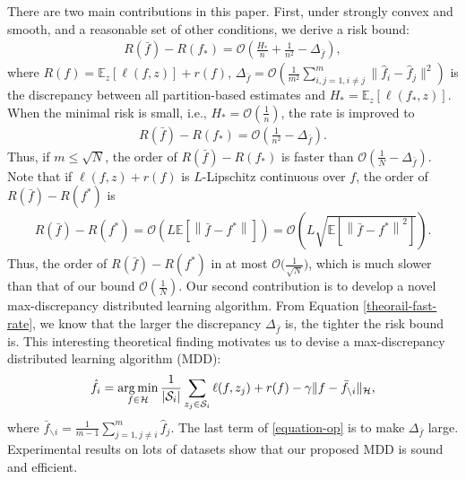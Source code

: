 \documentclass{article}
\newcommand{\argmin}{\operatornamewithlimits{arg\,min}}
\begin{document}
There are two main contributions in this paper.
First, under strongly convex and smooth, and a reasonable set of other conditions,
we derive a risk bound:
\begin{align}
\label{theorail-fast-rate}
    R(\bar{f})-R(f_\ast)=\mathcal{O}\left(\frac{H_\ast}{n}
    +\frac{1}{n^2}
    -\Delta_{\bar{f}}\right),
  \end{align}
  where $R(f)=\mathbb{E}_{z}[\ell(f,z)]+r(f)$,
  $\Delta_{\bar{f}}=\mathcal{O}\left(\frac{1}{m^2}\sum_{i,j=1,i\not=j}^m\|\hat{f}_i-\hat{f}_j\|^2\right)$ is the discrepancy between all partition-based estimates and
  $H_\ast=\mathbb{E}_{z}\left[\ell(f_\ast,z)\right]$.
When the minimal risk is small, i.e., $H_\ast=\mathcal{O}\left(\frac{1}{n}\right)$,
the rate is improved to
\begin{align*}
    R(\bar{f})-R(f_\ast)=\mathcal{O}\left(\frac{1}{n^2}-\Delta_{\bar{f}}\right).
\end{align*}
Thus, if $m\leq \sqrt{N}$, the order of $R(\bar{f})-R(f_\ast)$ is faster than
$\mathcal{O}\left(\frac{1}{N}-\Delta_{\bar{f}}\right).$
Note that if $\ell(f,z)+r(f)$ is $L$-Lipschitz continuous over $f$,
the order of $R(\bar{f})-R(f^\ast)$ is
\begin{align*}
  R(\bar{f})-R(f^\ast)=\mathcal{O}\left(L\mathbb{E}\left[\left\|\bar{f}-f^\ast\right\|\right]\right)=\mathcal{O}\left(L\sqrt{\mathbb{E}\left[\left\|\bar{f}-f^\ast\right\|^2\right]}\right).
\end{align*}
Thus, the order of $R(\bar{f})-R(f^\ast)$ in \cite{zhang2012communication,Zhang2013,lin2017distributed}
 at most $\mathcal{O}\big({\frac{1}{\sqrt{N}}}\big)$,
 which is much slower than that of our bound $\mathcal{O}\left({\frac{1}{N}}\right)$.
Our second contribution is to develop a novel max-discrepancy distributed learning algorithm.
From Equation \eqref{theorail-fast-rate},
we know that the larger the discrepancy $\Delta_{\bar{f}}$ is, the tighter the risk bound is.
This  interesting theoretical finding motivates us to devise a max-discrepancy distributed learning algorithm (MDD):
\begin{align}
\label{equation-op}
  \hat{f}_i=\argmin_{f\in\mathcal{H}}\frac{1}{|\mathcal{S}_i|}\sum_{z_j\in\mathcal{S}_i}\ell(f,z_j)+r(f)-\gamma \|f-\bar{f}_{\backslash i}\|_\mathcal{H},
\end{align}
where $\bar{f}_{\backslash i}=\frac{1}{m-1}\sum_{j=1,j\not =i}^m\hat{f}_j$.
The last term of \eqref{equation-op} is to make $\Delta_{\bar{f}}$ large.
Experimental results on lots of datasets show that our proposed MDD is sound and efficient.
\end{document}
